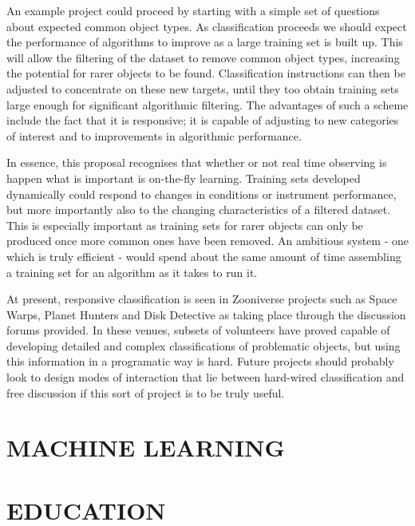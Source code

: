 \documentclass{pasa}
\begin{document}
An example project could proceed by starting with a simple set of questions about expected common object types. As classification proceeds we should expect the performance of algorithms to improve as a large training set is built up. This will allow the filtering of the dataset to remove common object types, increasing the potential for rarer objects to be found. Classification instructions can then be adjusted to concentrate on these new targets, until they too obtain training sets large enough for significant algorithmic filtering. The advantages of such a scheme include the fact that it is responsive; it is capable of adjusting to new categories of interest and to improvements in algorithmic performance. 

In essence, this proposal recognises that whether or not real time observing is happen what is important is on-the-fly learning. Training sets developed dynamically could respond to changes in conditions or instrument performance, but more importantly also to the changing characteristics of a filtered dataset. This is especially important as training sets for rarer objects can only be produced once more common ones have been removed. An ambitious system - one which is truly efficient - would spend about the same amount of time assembling a training set for an algorithm as it takes to run it. 

At present, responsive classification is seen in Zooniverse projects such as Space Warps, Planet Hunters and Disk Detective as taking place through the discussion forums provided. In these venues, subsets of volunteers have proved capable of developing detailed and complex classifications of problematic objects, but using this information in a programatic way is hard. Future projects should probably look to design modes of interaction that lie between hard-wired classification and free discussion if this sort of project is to be truly useful. 


\section{MACHINE LEARNING}
\label{sec:ml}

\section{EDUCATION}
\label{sec:edu}
\end{document}
